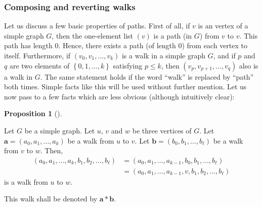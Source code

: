 \documentclass[numbers=enddot,12pt,final,onecolumn,notitlepage]{scrartcl}%
\theoremstyle{definition}
\newtheorem{prop}[theo]{Proposition}
\newenvironment{proposition}[1][]
{\begin{prop}[#1]\begin{leftbar}}
{\end{leftbar}\end{prop}}
\newcommand{\set}[1]{\left\{ #1 \right\}}
\newcommand{\tup}[1]{\left( #1 \right)}
\begin{document}
\subsubsection{Composing and reverting walks}

Let us discuss a few basic properties of paths. First of all, if $v$
is an vertex of a simple graph $G$, then the one-element list
$\tup{v}$ is a path (in $G$) from $v$ to $v$. This path has length
$0$. Hence, there exists a path (of length $0$) from each vertex to
itself. Furthermore, if $\tup{v_0, v_1, \ldots, v_k}$ is a walk in a
simple graph $G$, and if $p$ and $q$ are two elements of
$\set{0, 1, \ldots, k}$ satisfying $p \leq k$, then
$\tup{v_p, v_{p+1}, \ldots, v_q}$ also is a walk in $G$. The same
statement holds if the word ``walk'' is replaced by ``path'' both
times. Simple facts like this will be used without further mention.
Let us now pass to a few facts which are less obvious (although
intuitively clear):

\begin{proposition} \label{prop.walks.concat}
Let $G$ be a simple graph. Let $u$, $v$ and $w$ be three vertices of
$G$.
Let $\mathbf{a} = \tup{a_0, a_1, \ldots, a_k}$ be a walk from $u$ to
$v$. 
Let $\mathbf{b} = \tup{b_0, b_1, \ldots, b_\ell}$ be a walk from $v$
to $w$.
Then,
\begin{align*}
\tup{a_0, a_1, \ldots, a_k, b_1, b_2, \ldots, b_\ell}
&= \tup{a_0, a_1, \ldots, a_{k-1}, b_0, b_1, \ldots, b_\ell} \\
&= \tup{a_0, a_1, \ldots, a_{k-1}, v, b_1, b_2, \ldots, b_\ell}
\end{align*}
is a walk from $u$ to $w$.

This walk shall be denoted by $\mathbf{a} * \mathbf{b}$.
\end{proposition}
\end{document}
